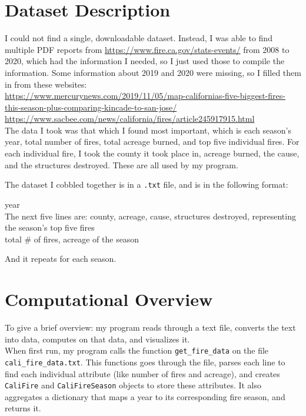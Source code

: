 \documentclass[fontsize=11pt]{article}
\begin{document}
\section*{Dataset Description}
I could not find a single, downloadable dataset. Instead, I was able to find multiple PDF reports from \url{https://www.fire.ca.gov/stats-events/} from 2008 to 2020, which had the information I needed, so I just used those to compile the information. Some information about 2019 and 2020 were missing, so I filled them in from these websites:\\

\url{https://www.mercurynews.com/2019/11/05/map-californias-five-biggest-fires-this-season-plus-comparing-kincade-to-san-jose/}\\

\url{https://www.sacbee.com/news/california/fires/article245917915.html}\\

The data I took was that which I found most important, which is each season's year, total number of fires, total acreage burned, and top five individual fires. For each individual fire, I took the county it took place in, acreage burned, the cause, and the structures destroyed. These are all used by my program.

The dataset I cobbled together is in a \texttt{.txt} file, and is in the following format:
\begin{center}
    year\\
    The next five lines are: county, acreage, cause, structures destroyed, representing the season's top five fires\\
    total \# of fires, acreage of the season
\end{center}
And it repeats for each season.

\section*{Computational Overview}

To give a brief overview: my program reads through a text file, converts the text into data, computes on that data, and visualizes it.\\

When first run, my program calls the function \texttt{get\_fire\_data} on the file \texttt{cali\_fire\_data.txt}. This functions goes through the file, parses each line to find each individual attribute (like number of fires and acreage), and creates \texttt{CaliFire} and \texttt{CaliFireSeason} objects to store these attributes. It also aggregates a dictionary that maps a year to its corresponding fire season, and returns it.\\
\end{document}
